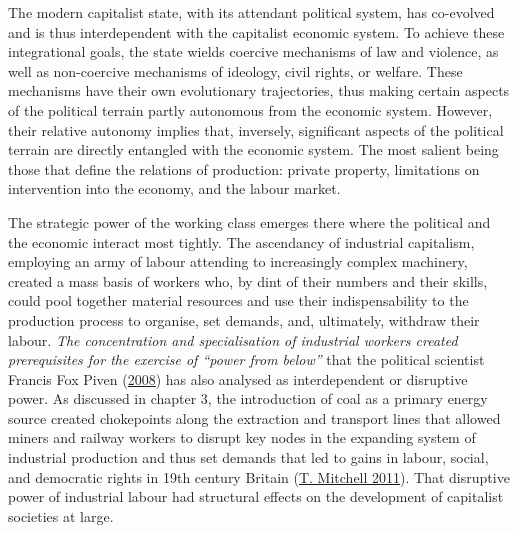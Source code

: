 \documentclass[a4paper, nobind]{templates/ociamthesis}
\begin{document}
The modern capitalist state, with its attendant political system, has co-evolved and is thus interdependent with the capitalist economic system. To achieve these integrational goals, the state wields coercive mechanisms of law and violence, as well as non-coercive mechanisms of ideology, civil rights, or welfare. These mechanisms have their own evolutionary trajectories, thus making certain aspects of the political terrain partly autonomous from the economic system. However, their relative autonomy implies that, inversely, significant aspects of the political terrain are directly entangled with the economic system. The most salient being those that define the relations of production: private property, limitations on intervention into the economy, and the labour market.

The strategic power of the working class emerges there where the political and the economic interact most tightly. The ascendancy of industrial capitalism, employing an army of labour attending to increasingly complex machinery, created a mass basis of workers who, by dint of their numbers and their skills, could pool together material resources and use their indispensability to the production process to organise, set demands, and, ultimately, withdraw their labour. \emph{The concentration and specialisation of industrial workers created prerequisites for the exercise of ``power from below''} that the political scientist Francis Fox Piven (\protect\hyperlink{ref-piven_can_2008}{2008}) has also analysed as interdependent or disruptive power. As discussed in chapter 3, the introduction of coal as a primary energy source created chokepoints along the extraction and transport lines that allowed miners and railway workers to disrupt key nodes in the expanding system of industrial production and thus set demands that led to gains in labour, social, and democratic rights in 19th century Britain (\protect\hyperlink{ref-mitchell_carbon_2011}{T. Mitchell 2011}). That disruptive power of industrial labour had structural effects on the development of capitalist societies at large.
\end{document}
